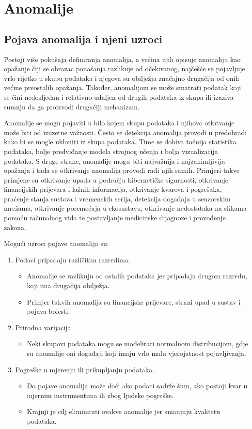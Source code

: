 \documentclass[utf8, diplomski, numeric]{fer}
\begin{document}
\chapter{Anomalije}
\section{Pojava anomalija i njeni uzroci}
Postoji više pokušaja definiranja anomalija, a većina njih opisuje anomaliju kao opažanje čiji se obrazac ponašanja razlikuje od očekivanog, najčešće se pojavljuje vrlo rijetko u skupu podataka i njegova su obilježja značajno drugačija od onih većine preostalih opažanja. Također, anomalijom se može smatrati podatak koji se čini nedosljedan i relativno udaljen od drugih podataka iz skupa ili izaziva sumnju da ga proizvodi drugačiji mehanizam.

Anomalije se mogu pojaviti u bilo kojem skupu podataka i njihovo otkrivanje može biti od izuzetne važnosti. Često se detekcija anomalija provodi u predobradi kako bi se mogle ukloniti iz skupa podataka. Time se dobiva točnija statistika podataka, bolje predviđanje modela strojnog učenja i bolja vizualizacija podataka. S druge strane, anomalije mogu biti najvažnija i najzanimljivija opažanja i tada se otkrivanje anomalija provodi radi njih samih. Primjeri takve primjene su otkrivanje upada u području kibernetičke sigurnosti, otkrivanje financijskih prijevara i lažnih informacija, otkrivanje kvarova i pogrešaka, praćenje stanja sustava i vremenskih serija, detekcija događaja u senzorskim mrežama, otkrivanje poremećaja u ekosustavu, otkrivanje nedostataka na slikama pomoću računalnog vida te postavljanje medicinske dijagnoze i provođenje zakona.

Mogući uzroci pojave anomalija su:
\begin{enumerate}
\item Podaci pripadaju različitim razredima.
\begin{itemize}
\item Anomalije se razlikuju od ostalih podataka jer pripadaju drugom razredu, koji ima drugačija obilježja.
\item Primjer takvih anomalija su financijske prijevare, strani upad u sustav i pojava bolesti.
\end{itemize}
\item Prirodna varijacija.
\begin{itemize}
\item Neki skupovi podataka mogu se modelirati normalnom distribucijom, gdje su anomalije oni događaji koji imaju vrlo malu vjerojatnost pojavljivanja.
\end{itemize}
\item Pogreške u mjerenju ili prikupljanju podataka.
\begin{itemize}
\item Do pojave anomalija može doći ako podaci sadrže šum, ako postoji kvar u mjernim instrumentima ili zbog ljudske pogreške.
\item Krajnji je cilj eliminirati ovakve anomalije jer smanjuju kvalitetu podataka.
\end{itemize}
\end{enumerate}
\end{document}
